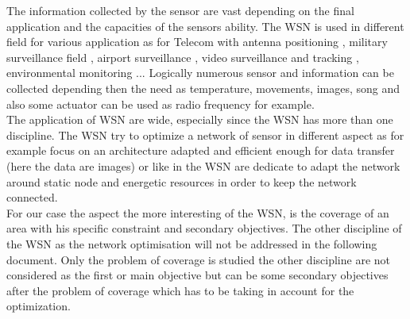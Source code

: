 The information collected by the sensor are vast depending on the final application and the capacities of the sensors ability. 
The WSN is used in different field for various application as for Telecom with antenna positioning \cite{59*wang2008}, military surveillance field \cite{38*liu2010,101*topcuoglu2009}, airport surveillance \cite{37*ma2012}, video surveillance and tracking \cite{38*liu2010}, environmental monitoring \cite{42*bulusu2001}... 
Logically numerous sensor and information can be collected depending then the need as temperature, movements, images, song and also some  actuator can be used as radio frequency for example.\\
 The application of WSN are wide, especially since the WSN has more than one discipline. The WSN try to optimize a network of sensor in different aspect as for example \cite{39*wu2011} focus on an architecture adapted and efficient enough for data transfer (here the data are images) or like in \cite{40*sohrabi2000} the WSN are dedicate to adapt the network around static node and energetic resources in order to keep the network connected.  \\
For our case the aspect the more interesting of the WSN, is the coverage of an area with his specific constraint and secondary objectives.
 The other discipline of the WSN as the network optimisation will not be addressed in the following document. Only the problem of coverage is studied the other discipline are not considered as the first or main objective but can be some secondary objectives after the problem of coverage which has to be taking in account for the optimization. 

